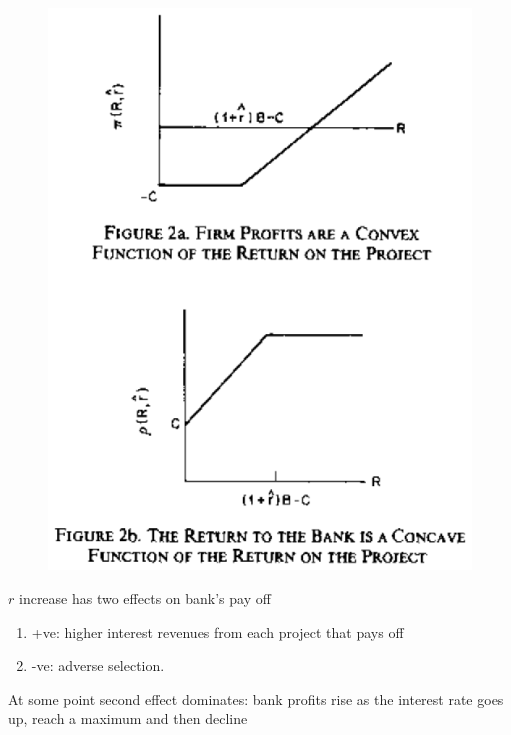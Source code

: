 \documentclass{beamer}
\begin{document}
\begin{frame}
  \begin{figure}
    \includegraphics{stiglitz_weiss2.eps}
  \end{figure}
\end{frame}

\begin{frame}
 $r$ increase has two effects on bank's pay off 
\begin{enumerate}
  \item +ve: higher interest revenues from each project that pays off
  \item -ve: adverse selection.   
\end{enumerate}
At some point second effect dominates: bank profits rise as the interest rate goes up, reach a maximum and then decline
\end{frame}
\end{document}
